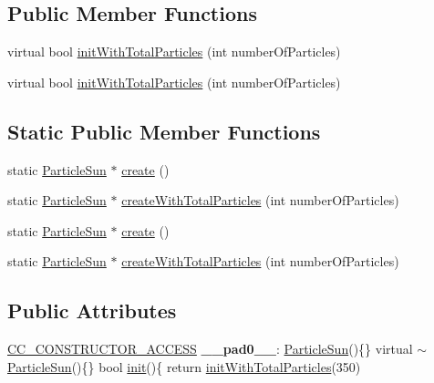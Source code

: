\subsection*{Public Member Functions}
\begin{DoxyCompactItemize}
\item 
virtual bool \hyperlink{classParticleSun_a59617ff3aeed92b7e5b3fe3e823c0661}{init\+With\+Total\+Particles} (int number\+Of\+Particles)
\item 
virtual bool \hyperlink{classParticleSun_a3d601303a1c2375f8ddc3e8a3306e8ae}{init\+With\+Total\+Particles} (int number\+Of\+Particles)
\end{DoxyCompactItemize}
\subsection*{Static Public Member Functions}
\begin{DoxyCompactItemize}
\item 
static \hyperlink{classParticleSun}{Particle\+Sun} $\ast$ \hyperlink{classParticleSun_a0608c99c0c7fe36cf7c02c5dcd0286eb}{create} ()
\item 
static \hyperlink{classParticleSun}{Particle\+Sun} $\ast$ \hyperlink{classParticleSun_ae9bf564c73b0020dc02bce7e1327a784}{create\+With\+Total\+Particles} (int number\+Of\+Particles)
\item 
static \hyperlink{classParticleSun}{Particle\+Sun} $\ast$ \hyperlink{classParticleSun_a74ab317d60eb930da1608dcf2047d745}{create} ()
\item 
static \hyperlink{classParticleSun}{Particle\+Sun} $\ast$ \hyperlink{classParticleSun_ad1f2c33a346e33b0028b49326650d087}{create\+With\+Total\+Particles} (int number\+Of\+Particles)
\end{DoxyCompactItemize}
\subsection*{Public Attributes}
\begin{DoxyCompactItemize}
\item 
\mbox{\label{classParticleSun_ade91e0aec2f9e82d5499437235ccd5cd}} 
\hyperlink{_2cocos2d_2cocos_2base_2ccConfig_8h_a25ef1314f97c35a2ed3d029b0ead6da0}{C\+C\+\_\+\+C\+O\+N\+S\+T\+R\+U\+C\+T\+O\+R\+\_\+\+A\+C\+C\+E\+SS} {\bfseries \+\_\+\+\_\+pad0\+\_\+\+\_\+}\+: \hyperlink{classParticleSun}{Particle\+Sun}()\{\} virtual $\sim$\hyperlink{classParticleSun}{Particle\+Sun}()\{\} bool \hyperlink{classParticleSystem_a65c05b30432f6e8aeb45ba018f3a8d3f}{init}()\{ return \hyperlink{classParticleSun_a59617ff3aeed92b7e5b3fe3e823c0661}{init\+With\+Total\+Particles}(350)
\end{DoxyCompactItemize}
